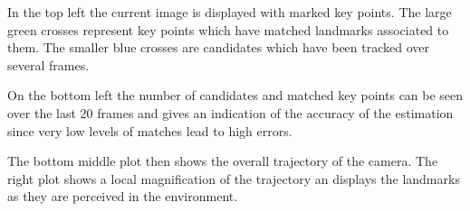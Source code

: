 In the top left the current image is displayed with marked key points. The large green crosses represent key points which have matched landmarks associated to them. The smaller blue crosses are candidates which have been tracked over several frames. \par
On the bottom left the number of candidates and matched key points can be seen over the last 20 frames and gives an indication of the accuracy of the estimation since very low levels of matches lead to high errors. \par 
The bottom middle plot then shows the overall trajectory of the camera. The right plot shows a local magnification of the trajectory an displays the landmarks as they are perceived in the environment.